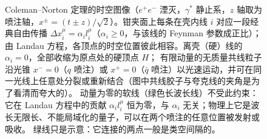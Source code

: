 \begin{figure}[htbp]
\caption{Coleman--Norton 定理的时空图像（$e^+e^-$ 湮灭，$\gamma^*$ 静止系，$z$ 轴取为喷注轴，$x^\pm=(t\pm z)/\sqrt2$）。钳夹面上每条在壳内线 $i$
对应一段经典自由传播 $\Delta x_i^\mu=\alpha_i l_i^\mu$（$\alpha_i\ge0$，与该线的 Feynman 参数成正比）；由 Landau 方程，各顶点的时空位置彼此相容。离壳（硬）线的 $\alpha_i=0$，全部收缩为原点处的硬顶点 $H$；
有限动量的无质量共线粒子沿光锥 $x^-=0$（$q$ 喷注）或 $x^+=0$（$\bar q$ 喷注）以光速运动，并可在同一光线上任意处分裂或重新结合（图中共线胶子与夸克线的夹角是为了看清而夸大的）。
动量为零的软线（绿色长波长线）不受此约束：它在 Landau 方程中的贡献 $\alpha_i l_i^\mu$ 恒为零，与 $\alpha_i$ 无关；物理上它是波长无限长、不能局域化的量子，可以在两个喷注的任意位置被发射或吸收。
绿线只是示意：它连接的两点一般是类空间隔的。}
\label{fig:coleman-norton}
\end{figure}

